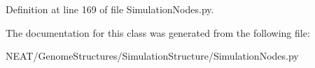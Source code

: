 Definition at line 169 of file Simulation\+Nodes.\+py.



The documentation for this class was generated from the following file\+:\begin{DoxyCompactItemize}
\item 
N\+E\+A\+T/\+Genome\+Structures/\+Simulation\+Structure/Simulation\+Nodes.\+py\end{DoxyCompactItemize}
